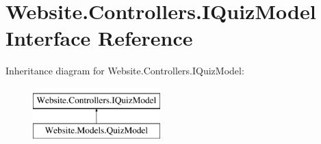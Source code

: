 \hypertarget{interface_website_1_1_controllers_1_1_i_quiz_model}{}\section{Website.\+Controllers.\+I\+Quiz\+Model Interface Reference}
\label{interface_website_1_1_controllers_1_1_i_quiz_model}
Inheritance diagram for Website.\+Controllers.\+I\+Quiz\+Model\+:\begin{figure}[H]
\begin{center}
\leavevmode
\includegraphics[height=2.000000cm]{interface_website_1_1_controllers_1_1_i_quiz_model}
\end{center}
\end{figure}
